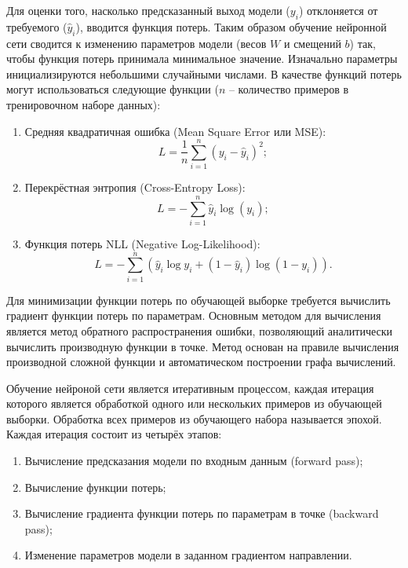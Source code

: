 Для оценки того, насколько предсказанный выход модели ($y_i$) отклоняется от требуемого ($\hat y_i$), вводится функция потерь. Таким образом обучение нейронной сети сводится к изменению параметров модели (весов $W$ и смещений $b$) так, чтобы функция потерь принимала минимальное значение. Изначально параметры инициализируются небольшими случайными числами. В качестве функций потерь могут использоваться следующие функции ($n$ -- количество примеров в тренировочном наборе данных):
\begin{enumerate}
    \item Средняя квадратичная ошибка (Mean Square Error или MSE): 
    \begin{equation}
        L = \frac{1}{n}\sum_{i = 1}^{n}\left(y_i - \hat y_i\right)^2;
    \end{equation}
    \item Перекрёстная энтропия (Cross-Entropy Loss): 
    \begin{equation}
        L = - \sum_{i = 1}^{n}\hat y_i \log \left(y_i\right);
    \end{equation}
    \item Функция потерь NLL (Negative Log-Likelihood): 
    \begin{equation}
        L = - \sum_{i = 1}^{n}\left( \hat y_i \log y_i + (1 - \hat y_i) \log (1 - y_i)\right).
    \end{equation}
\end{enumerate} 

Для минимизации функции потерь по обучающей выборке требуется вычислить градиент функции потерь по параметрам. Основным методом для вычисления является метод обратного распространения ошибки, позволяющий аналитически вычислить производную функции в точке. Метод основан на правиле вычисления производной сложной функции и автоматическом построении графа вычислений.

Обучение нейроной сети является итеративным процессом, каждая итерация которого является обработкой одного или нескольких примеров из обучающей выборки. Обработка всех примеров из обучающего набора называется эпохой. Каждая итерация состоит из четырёх этапов:
\begin{enumerate}
    \item Вычисление предсказания модели по входным данным (forward pass);
    \item Вычисление функции потерь;
    \item Вычисление градиента функции потерь по параметрам в точке (backward pass);
    \item Изменение параметров модели в заданном градиентом направлении.
\end{enumerate}

